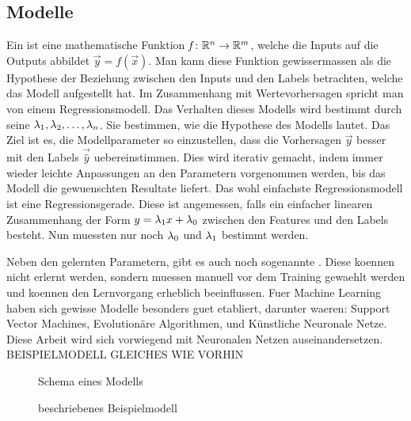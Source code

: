 \subsection{Modelle}
Ein  ist eine mathematische Funktion $\mathit{f}\colon \mathbb{R}^n \to \mathbb{R}^m$, welche die Inputs auf die Outputs abbildet $\vec{y}=\mathit{f}(\vec{x})$.
Man kann diese Funktion gewissermassen als die Hypothese der Beziehung zwischen
den Inputs und den Labels betrachten, welche das Modell aufgestellt hat.
Im Zusammenhang mit Wertevorhersagen spricht man von einem Regressionsmodell.
Das Verhalten dieses Modells wird bestimmt durch seine 
$\lambda_1, \lambda_2,\ldots,\lambda_n$. Sie bestimmen, wie die Hypothese des Modells lautet.
Das Ziel ist es, die Modellparameter so einzustellen, dass die Vorhersagen $\vec{y}$ besser mit den Labels $\vec{\hat{y}}$ uebereinstimmen.
Dies wird iterativ gemacht, indem immer wieder leichte Anpassungen an den
Parametern vorgenommen werden, bis das Modell die gewuenschten Resultate liefert.
\para{}
Das wohl einfachste Regressionsmodell ist eine Regressionsgerade. Diese ist
angemessen, falls ein einfacher linearen Zusammenhang der Form $y=\lambda_1x +
\lambda_0$ zwischen den Features und den Labels besteht.
Nun muessten nur noch $\lambda_0$ und $\lambda_1$ bestimmt werden.

Neben den gelernten Parametern, gibt es auch noch sogenannte .
Diese koennen nicht erlernt werden, sondern muessen manuell vor dem Training gewaehlt werden und koennen den Lernvorgang erheblich beeinflussen.
\para{}
Fuer Machine Learning haben sich gewisse Modelle besonders guet etabliert,
darunter waeren: Support Vector Machines, Evolutionäre Algorithmen, und Künstliche Neuronale Netze.
Diese Arbeit wird sich vorwiegend mit Neuronalen Netzen auseinandersetzen.
\para{}
BEISPIELMODELL GLEICHES WIE VORHIN

\begin{figure}[h!]
  \centering


  \caption{Schema eines Modells}
\end{figure}

\begin{figure}[h!]
  \caption{beschriebenes Beispielmodell}
\end{figure}


